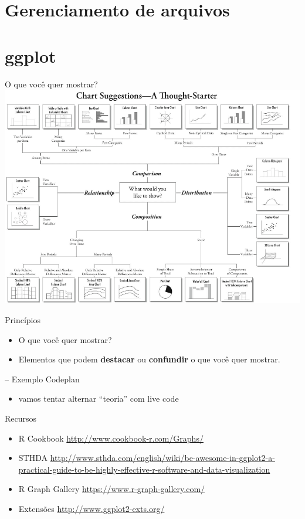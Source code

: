 \documentclass[
  9pt,
  ignorenonframetext,
]{beamer}
\providecommand{\tightlist}{%
  \setlength{\itemsep}{0pt}\setlength{\parskip}{0pt}}
\begin{document}
\hypertarget{gerenciamento-de-arquivos}{%
\section{Gerenciamento de arquivos}\label{gerenciamento-de-arquivos}}

\hypertarget{ggplot}{%
\section{ggplot}\label{ggplot}}

\begin{frame}{O que você quer mostrar?}
\protect\hypertarget{o-que-vocuxea-quer-mostrar}{}
\includegraphics{imgs/Pic_2.png}
\end{frame}

\begin{frame}{Princípios}
\protect\hypertarget{princuxedpios}{}
\begin{itemize}
\item
  O que você quer mostrar?
\item
  Elementos que podem \textbf{destacar} ou \textbf{confundir} o que você
  quer mostrar.
\end{itemize}

-- Exemplo Codeplan

\begin{itemize}
\tightlist
\item
  vamos tentar alternar ``teoria'' com live code
\end{itemize}
\end{frame}

\begin{frame}{Recursos}
\protect\hypertarget{recursos}{}
\begin{itemize}
\item
  R Cookbook \url{http://www.cookbook-r.com/Graphs/}
\item
  STHDA
  \url{http://www.sthda.com/english/wiki/be-awesome-in-ggplot2-a-practical-guide-to-be-highly-effective-r-software-and-data-visualization}
\item
  R Graph Gallery \url{https://www.r-graph-gallery.com/}
\item
  Extensões \url{http://www.ggplot2-exts.org/}
\end{itemize}
\end{frame}
\end{document}
